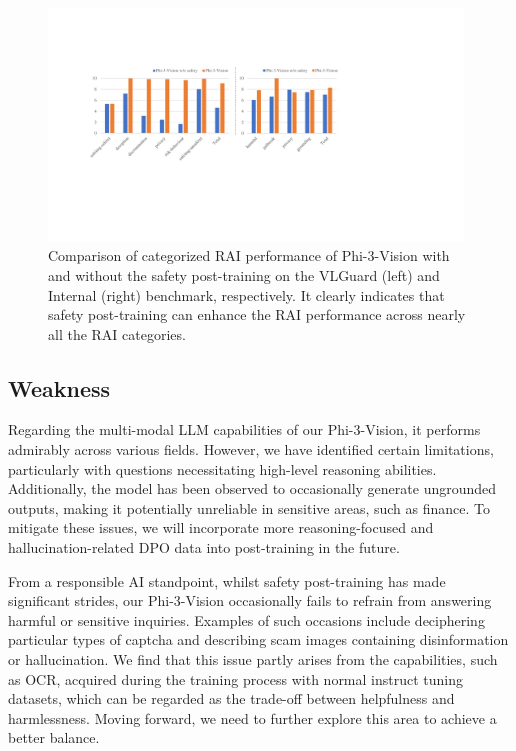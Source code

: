 \documentclass[11pt]{article}
\newcommand{\phivision}{Phi-3-Vision\xspace}
\begin{document}
\begin{figure}[h]
    \centering
    \includegraphics[width=0.98\textwidth]{categorized_RAI.pdf}
    \caption{Comparison of categorized RAI performance of \phivision with and without the safety post-training on the VLGuard (left) and Internal (right) benchmark, respectively.  It clearly indicates that safety post-training can enhance the RAI performance across nearly all the RAI categories.}
    \label{fig:v-safety-pt}
\end{figure}




\subsection{Weakness}
Regarding the multi-modal LLM capabilities of our \phivision, it performs admirably across various fields. However, we have identified certain limitations, particularly with questions necessitating high-level reasoning abilities. Additionally, the model has been observed to occasionally generate ungrounded outputs, making it potentially unreliable in sensitive areas, such as finance. To mitigate these issues, we will incorporate more reasoning-focused and hallucination-related DPO data into post-training in the future. 

From a responsible AI standpoint, whilst safety post-training has made significant strides, our \phivision occasionally fails to refrain from answering harmful or sensitive inquiries. Examples of such occasions include deciphering particular types of captcha and describing scam images containing disinformation or hallucination. We find that this issue partly arises from the capabilities, such as OCR, acquired during the training process with normal instruct tuning datasets, which can be regarded as the trade-off between helpfulness and harmlessness. Moving forward, we need to further explore this area to achieve a better balance. 
\end{document}
